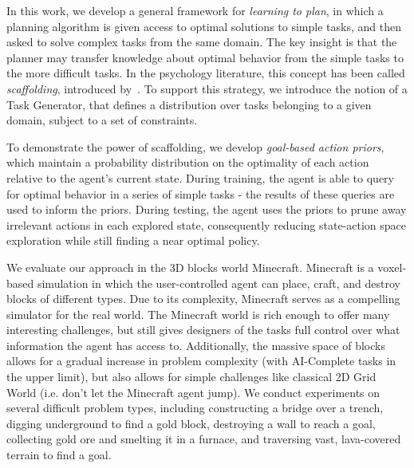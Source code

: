 \documentclass[11pt]{article}
\begin{document}
In this work, we develop a general framework for {\it learning to plan}, in which a planning algorithm is given access to optimal solutions to simple tasks, and then asked to solve complex tasks from the same domain. The key insight is that the planner may transfer knowledge about optimal behavior from the simple tasks to the more difficult tasks. In the psychology literature, this concept has been called {\it scaffolding}, introduced by~\cite{wood1976role}. To support this strategy, we introduce the notion of a Task Generator, that defines a distribution over tasks belonging to a given domain, subject to a set of constraints.

To demonstrate the power of scaffolding, we develop {\it goal-based action priors}, which maintain a probability distribution on the optimality of each action relative to the agent's current state. During training, the agent is able to query for optimal behavior in a series of simple tasks - the results of these queries are used to inform the priors. During testing, the agent uses the priors to prune away irrelevant actions in each explored state, consequently reducing state-action space exploration while still finding a near optimal policy.

We evaluate our approach in the 3D blocks world Minecraft. Minecraft is a voxel-based simulation in which the user-controlled agent can place, craft, and destroy blocks of different types. Due to its complexity, Minecraft serves as a compelling simulator for the real world. The Minecraft world is rich enough to offer many interesting challenges, but still gives designers of the tasks full control over what information the agent has access to. Additionally, the massive space of blocks allows for a gradual increase in problem complexity (with AI-Complete tasks in the upper limit), but also allows for simple challenges like classical 2D Grid World (i.e. don't let the Minecraft agent jump). We conduct experiments on several difficult problem types, including constructing a bridge over a trench, digging underground to find a gold block, destroying a wall to reach a goal, collecting gold ore and smelting it in a furnace, and traversing vast, lava-covered terrain to find a goal.

\end{document}
